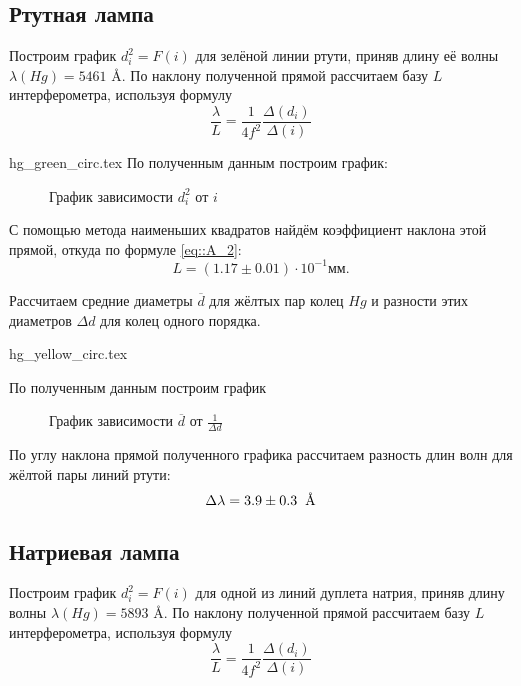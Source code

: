 \subsection{Ртутная лампа}
Построим график $d_i^2 = F(i)$ для зелёной линии ртути, приняв 
длину её волны $\lambda (Hg) = 5461$ \AA. По наклону 
полученной прямой рассчитаем базу $L$ интерферометра, используя 
формулу 
\begin{equation}\label{eq::A_2}
  \frac{\lambda}{L} = \frac{1}{4f^2} \frac{\Delta(d_i)}{\Delta(i)}
\end{equation}


{hg_green_circ.tex}
По полученным данным построим график:

\begin{figure}[h]
  \caption{График зависимости $d_i^2$ от $i$}
  \label{img::gr_1}
\end{figure}

С помощью метода наименьших квадратов найдём коэффициент наклона этой 
прямой, откуда по формуле \eqref{eq::A_2}:
$$
L = (1.17 \pm 0.01) \cdot 10^{-1} мм.
$$

Рассчитаем средние диаметры $\overline{d}$ для жёлтых пар колец
$Hg$ и разности этих диаметров $\Delta d$ для колец одного порядка.

{hg_yellow_circ.tex}

По полученным данным построим график 
\begin{figure}[h]
  \caption{График зависимости $\overline{d}$ от $\frac{1}{\Delta d}$}
\end{figure}

По углу наклона прямой полученного графика рассчитаем разность
длин волн для жёлтой пары линий ртути:
$$
\Delta \lambda = 3.9 \pm 0.3 \text{\: \AA}
$$

\newpage
\subsection{Натриевая лампа}

Построим график $d_i^2 = F(i)$ для одной из линий дуплета натрия, приняв 
длину волны $\lambda (Hg) = 5893$ \AA. По наклону 
полученной прямой рассчитаем базу $L$ интерферометра, используя 
формулу 
\begin{equation}\label{eq::A_3_2}
  \frac{\lambda}{L} = \frac{1}{4f^2} \frac{\Delta(d_i)}{\Delta(i)}
\end{equation}


